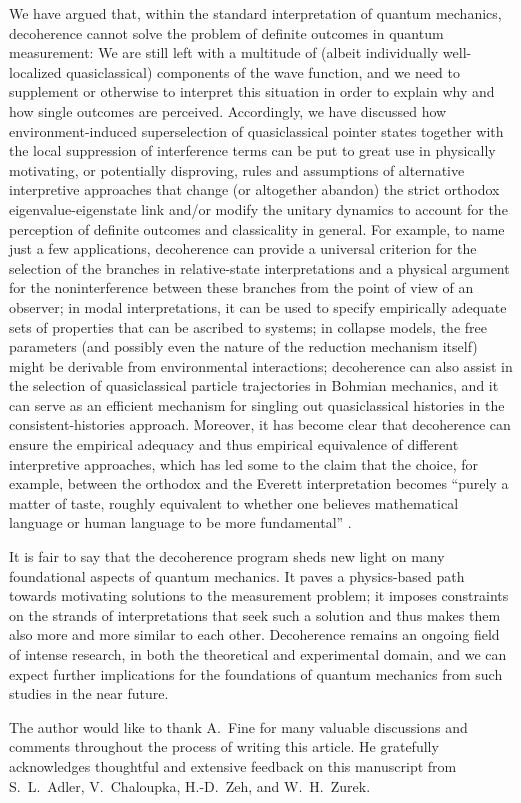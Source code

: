 \documentclass[twocolumn,rmp,aps,amsmath,amsfonts,noshowkeys,noshowpacs]{revtex4}
\begin{document}
We have argued that, within the standard interpretation of quantum
mechanics, decoherence cannot solve the problem of definite outcomes
in quantum measurement: We are still left with a multitude of (albeit
individually well-localized quasiclassical) components of the wave
function, and we need to supplement or otherwise to interpret this
situation in order to explain why and how single outcomes are
perceived. Accordingly, we have discussed how environment-induced
superselection of quasiclassical pointer states together with the
local suppression of interference terms can be put to great use in
physically motivating, or potentially disproving, rules and
assumptions of alternative interpretive approaches that change (or
altogether abandon) the strict orthodox eigenvalue-eigenstate link
and/or modify the unitary dynamics to account for the perception of
definite outcomes and classicality in general. For example, to name
just a few applications, decoherence can provide a universal criterion
for the selection of the branches in relative-state interpretations
and a physical argument for the noninterference between these branches
from the point of view of an observer; in modal interpretations, it
can be used to specify empirically adequate sets of properties that
can be ascribed to systems; in collapse models, the free parameters
(and possibly even the nature of the reduction mechanism itself) might
be derivable from environmental interactions; decoherence can also
assist in the selection of quasiclassical particle trajectories in
Bohmian mechanics, and it can serve as an efficient mechanism for
singling out quasiclassical histories in the consistent-histories
approach. Moreover, it has become clear that decoherence can ensure
the empirical adequacy and thus empirical equivalence of different
interpretive approaches, which has led some to the claim that the
choice, for example, between the orthodox and the Everett
interpretation becomes ``purely a matter of taste, roughly equivalent
to whether one believes mathematical language or human language to be
more fundamental'' \cite[p.~855]{Tegmark:1998:qq}.

It is fair to say that the decoherence program sheds new light on many
foundational aspects of quantum mechanics.  It paves a physics-based
path towards motivating solutions to the measurement problem; it
imposes constraints on the strands of interpretations that seek such a
solution and thus makes them also more and more similar to each other.
Decoherence remains an ongoing field of intense research, in both the
theoretical and experimental domain, and we can expect further
implications for the foundations of quantum mechanics from such
studies in the near future.


\begin{acknowledgments}

The author would like to thank A.~Fine for many valuable discussions
and comments throughout the process of writing this article.  He
gratefully acknowledges thoughtful and extensive feedback on this
manuscript from S.~L.~Adler, V.~Chaloupka, H.-D.~Zeh, and W.~H.~Zurek.

\end{acknowledgments}




\end{document}
